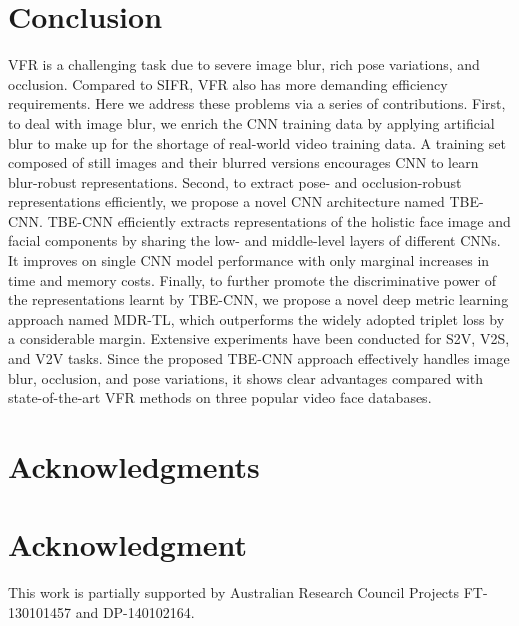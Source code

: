 \documentclass[10pt,journal,cspaper,compsoc]{IEEEtran}
\begin{document}
\section{Conclusion}
\label{Sec:Conclusion}
VFR is a challenging task due to severe image blur, rich pose variations, and occlusion.
Compared to SIFR, VFR also has more demanding efficiency requirements.
Here we address these problems via a series of contributions.
First, to deal with image blur, we enrich the CNN training data by applying artificial blur to make up for the shortage of real-world video training data.
A training set composed of still images and their blurred versions encourages CNN to learn blur-robust representations.
Second, to extract pose- and occlusion-robust representations efficiently,
we propose a novel CNN architecture named TBE-CNN.
TBE-CNN efficiently extracts representations of the holistic face image and facial components by sharing the low- and middle-level layers of different CNNs.
It improves on single CNN model performance with only marginal increases in time and memory costs.
Finally, to further promote the discriminative power of the representations learnt by TBE-CNN, we propose a novel deep metric learning approach named MDR-TL,
which outperforms the widely adopted triplet loss by a considerable margin.
Extensive experiments have been conducted for S2V, V2S, and V2V tasks.
Since the proposed TBE-CNN approach effectively handles image blur, occlusion, and pose variations,
it shows clear advantages compared with state-of-the-art VFR methods on three popular video face databases.







\ifCLASSOPTIONcompsoc
  \section*{Acknowledgments}
\else
  \section*{Acknowledgment}
\fi
This work is partially supported by Australian Research Council Projects FT-130101457 and DP-140102164.







\end{document}
